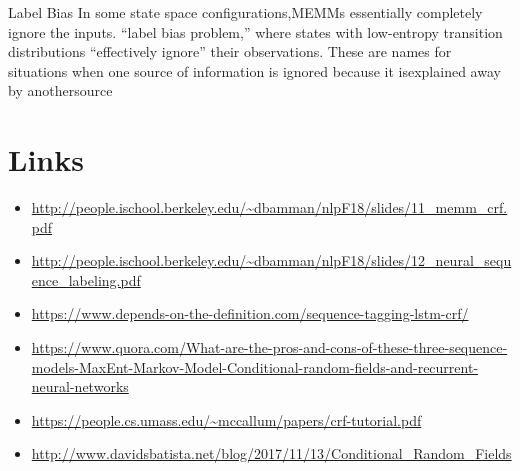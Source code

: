 Label Bias
In some state space configurations,MEMMs essentially completely ignore the inputs.
``label bias problem,'' where states with low-entropy transition distributions ``effectively ignore'' their observations.
These are names for situations when one source of information is ignored because it isexplained away by anothersource


\section{Links}

\begin{itemize}

\item \url{http://people.ischool.berkeley.edu/~dbamman/nlpF18/slides/11_memm_crf.pdf}

\item \url{http://people.ischool.berkeley.edu/~dbamman/nlpF18/slides/12_neural_sequence_labeling.pdf}

\item \url{https://www.depends-on-the-definition.com/sequence-tagging-lstm-crf/}

\item \url{https://www.quora.com/What-are-the-pros-and-cons-of-these-three-sequence-models-MaxEnt-Markov-Model-Conditional-random-fields-and-recurrent-neural-networks}

\item \url{https://people.cs.umass.edu/~mccallum/papers/crf-tutorial.pdf}

\item \url{http://www.davidsbatista.net/blog/2017/11/13/Conditional_Random_Fields} 

\end{itemize}

  
